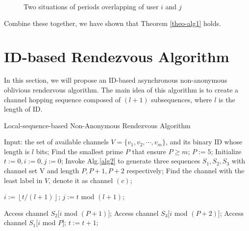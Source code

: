 \documentclass[10pt, conference, letterpaper]{IEEEtran}
\begin{document}
\begin{IEEEproof}
\begin{figure}
\centering
{}
\caption{Two situations of periods overlapping of user $i$ and $j$}
\label{sit_period}
\end{figure}

Combine these together, we have shown that Theorem \ref{theo-alg1} holds.
\end{IEEEproof}

\section{ID-based Rendezvous Algorithm}
In this section, we will propose an ID-based asynchronous non-anonymous oblivious rendezvous algorithm. The main idea of this algorithm is to create a channel hopping sequence composed of $(l + 1)$ subsequences, where $l$ is the length of ID.

\begin{algorithm}
\caption{Local-sequence-based Non-Anonymous Rendezvous Algorithm}
\label{alg3}
\begin{algorithmic}[1]
\STATE Input: the set of available channels $V=\{v_1,v_2,\cdots,v_m\}$, and its binary ID whose length is $l$ bits;
\STATE Find the smallest prime $P$ that ensure $P \ge m$;
\STATE $P:= 5$;
\ENDIF
\STATE Initialize $t := 0, i:= 0, j:= 0$;
\STATE Invoke Alg.\ref{alg2} to generate three sequences $S_1,S_2,S_3$ with channel set V and length $P, P+1, P+2$ respectively;
\STATE Find the channel with the least label in $V$, denote it as channel $(c)$;

\STATE $i := \left \lfloor t / (l+1) \right \rfloor$;
\STATE $j := t $ mod $(l  +1)$;

   \STATE Access channel $S_2[i$ mod $(P+1)]$;
    \ELSE
    \STATE Access channel $S_3[i$ mod $ (P+2)]$;
    \ENDIF
\ELSE
\STATE Access channel $S_1[i $ mod $ P]$;
\ENDIF
\STATE $t := t + 1$;
\ENDWHILE

\end{algorithmic}
\end{algorithm}
\end{document}
